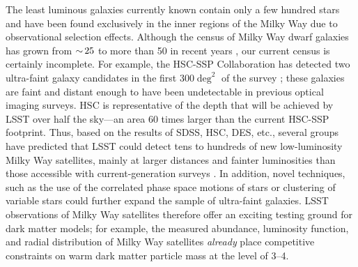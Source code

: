 The least luminous galaxies currently known contain only a few hundred stars and have been found exclusively in the inner regions of the Milky Way due to observational selection effects. Although the census of Milky Way dwarf galaxies has grown from $ {\sim}\, 25$ to more than 50 in recent years \citep[\eg, with DES;][]{Bechtol:2015, Koposov:2015, Drlica-Wagner:2015}, our current census is certainly incomplete.
For example, the HSC-SSP Collaboration has detected two ultra-faint galaxy candidates in the first $300 \deg^2$ of the survey \citep{1609.04346,1704.05977}; these galaxies are faint and distant enough to have been undetectable in previous optical imaging surveys. HSC is representative of the depth that will be achieved by LSST over half the sky---an area 60 times larger than the current HSC-SSP footprint. Thus, based on the results of SDSS, HSC, DES, etc., several groups have predicted that LSST could detect %
tens to hundreds of new low-luminosity Milky Way satellites, mainly at larger distances and fainter luminosities than those accessible with current-generation surveys \citep{Koposov:2008,Tollerud:2008,Hargis:2014,Newton:2018,Jethwa:2018,Nadler:2018,Kim:2017iwr}. 
In addition, novel techniques, such as the use of the correlated phase space motions of stars \citep{1507.04353,1805.02588} or clustering of variable stars \citep{1507.00734} could further expand the sample of ultra-faint galaxies.
LSST observations of Milky Way satellites therefore offer an exciting testing ground for dark matter models; for example, the measured abundance, luminosity function, and radial distribution of Milky Way satellites \emph{already} place competitive constraints on warm dark matter particle mass at the level of 3--4\keV \citep[\eg,][]{Jethwa:2018,Kim:2017iwr}.%

